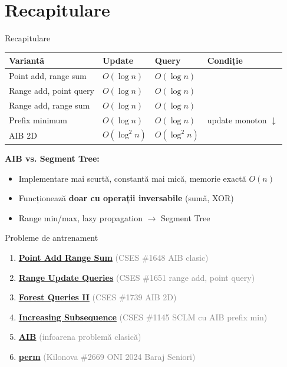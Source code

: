 \documentclass[10pt]{beamer}
\begin{document}
\section{Recapitulare}

\begin{frame}{Recapitulare}
  \begin{center}
  {\footnotesize
  \begin{tabular}{llll}
    \toprule
    Variantă & Update & Query & Condiție \\
    \midrule
    Point add, range sum & $O(\log n)$ & $O(\log n)$ & \textemdash{} \\
    Range add, point query & $O(\log n)$ & $O(\log n)$ & \textemdash{} \\
    Range add, range sum & $O(\log n)$ & $O(\log n)$ & \textemdash{} \\
    Prefix minimum & $O(\log n)$ & $O(\log n)$ & update monoton $\downarrow$ \\
    AIB 2D & $O(\log^2 n)$ & $O(\log^2 n)$ & \textemdash{} \\
    \bottomrule
  \end{tabular}}
  \end{center}
  \smallskip
  \textbf{AIB vs. Segment Tree:}
  \begin{itemize}\itemsep0pt
    \item[+] Implementare mai scurtă, constantă mai mică, memorie exactă $O(n)$
    \item[$-$] Funcționează \textbf{doar cu operații inversabile} (sumă, XOR)
    \item[$-$] Range min/max, lazy propagation $\rightarrow$ Segment Tree
  \end{itemize}
\end{frame}

\begin{frame}{Probleme de antrenament}
  \begin{enumerate}
    \item \href{https://cses.fi/problemset/task/1648}{\textbf{Point Add Range Sum}}
          \textcolor{gray}{(CSES \#1648 \textemdash{} AIB clasic)}
    \item \href{https://cses.fi/problemset/task/1651}{\textbf{Range Update Queries}}
          \textcolor{gray}{(CSES \#1651 \textemdash{} range add, point query)}
    \item \href{https://cses.fi/problemset/task/1652}{\textbf{Forest Queries II}}
          \textcolor{gray}{(CSES \#1739 \textemdash{} AIB 2D)}
    \item \href{https://cses.fi/problemset/task/1145}{\textbf{Increasing Subsequence}}
          \textcolor{gray}{(CSES \#1145 \textemdash{} SCLM cu AIB prefix min)}
    \item \href{https://infoarena.ro/problema/aib}{\textbf{AIB}}
          \textcolor{gray}{(infoarena \textemdash{} problemă clasică)}
    \item \href{https://kilonova.ro/problems/2669}{\textbf{perm}}
          \textcolor{gray}{(Kilonova \#2669 \textemdash{} ONI 2024 Baraj Seniori)}
  \end{enumerate}
\end{frame}
\end{document}
